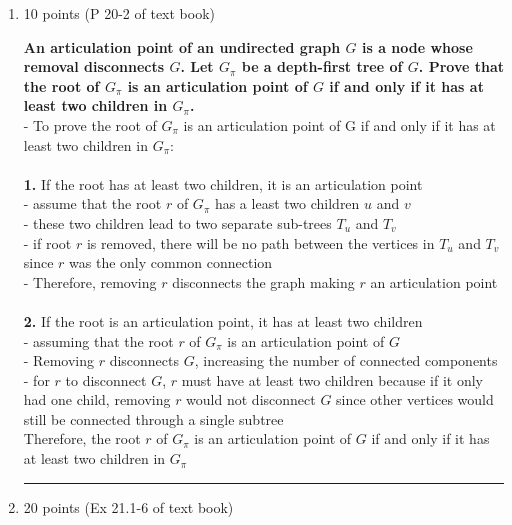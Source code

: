 \documentclass[letterpaper,12pt]{article}
\begin{document}
\begin{enumerate}
\noindent\rule{16cm}{0.1pt}
\item 10 points (P 20-2 of text book)

\textbf{An articulation point of an undirected graph $G$ is a node whose removal
disconnects $G$. Let $G_{\pi}$ be a depth-first tree of $G$. Prove that the root
of $G_{\pi}$ is an articulation point of $G$ if and only if it has at least two
children in $G_{\pi}$.} \\
- To prove the root of $G_\pi$ is an articulation point of G if and only if it has at least two children in $G_\pi$: \\ \\
\textbf{1.} If the root has at least two children, it is an articulation point \\
- assume that the root $r$ of $G_{\pi}$ has a least two children $u$ and $v$ \\
- these two children lead to two separate sub-trees $T_u$ and $T_v$ \\
- if root $r$ is removed, there will be no path between the vertices in $T_u$ and $T_v$ since $r$ was the only common connection \\
- Therefore, removing $r$ disconnects the graph making $r$ an articulation point \\ \\
\textbf{2.} If the root is an articulation point, it has at least two children \\
- assuming that the root $r$ of $G_{\pi}$ is an articulation point of $G$ \\
- Removing $r$ disconnects $G$, increasing the number of connected components \\
- for $r$ to disconnect $G$, $r$ must have at least two children because if it only had one child, removing $r$ would not disconnect $G$ since other vertices would still be connected through a single subtree \\

Therefore, the root $r$ of $G_{\pi}$ is an articulation point of $G$ if and only if it has at least two children in $G_{\pi}$ \\

\noindent\rule{16cm}{0.1pt}
\item 20 points (Ex 21.1-6 of text book)


\end{enumerate}
\end{document}
